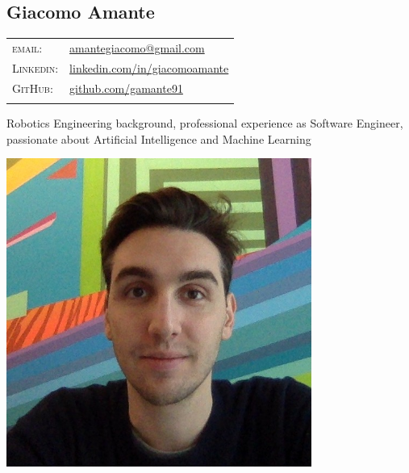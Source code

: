\documentclass[a4paper,10pt]{article}
\begin{document}
	
	\pagestyle{empty}

	\begin{minipage}{0.75\textwidth}
		\vspace{-10mm}
		\begin{flushleft}
			\section{\Huge Giacomo Amante}
			\vspace{2mm}
			\begin{tabular}{ll}
				\textsc{email:} & \href{mailto:amantegiacomo@gmail.com}{amantegiacomo@gmail.com} \\
				\textsc{Linkedin:} & 
				\href{http://www.linkedin.com/in/giacomoamante}{\color{black}linkedin.com/in/giacomoamante}\\
				\textsc{GitHub:} & \href{https://github.com/gamante91}{github.com/gamante91}\\
				\multicolumn{2}{c}{} \\
			\end{tabular}
		\end{flushleft}
	Robotics Engineering background, professional experience as Software Engineer,\\
	passionate about Artificial Intelligence and Machine Learning\\
	\end{minipage}
	\begin{minipage}[c]{0.25\textwidth}
		\begin{center}
			\includegraphics[width=0.75\textwidth]{GiacomoAmante_lowres}
		\end{center}
	\end{minipage}
\end{document}
